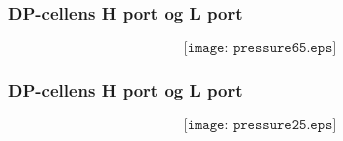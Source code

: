 \documentclass[aspectratio=169,xcolor=dvipsnames]{beamer}
\begin{document}
%
%
%
\begin{frame}
	\frametitle{DP-cellens H port og L port}

	$$\texttt{[image: pressure65.eps]}$$
\end{frame}
%
%
%
%
%
%
%
\begin{frame}
	\frametitle{DP-cellens H port og L port}

	$$\texttt{[image: pressure25.eps]}$$
\end{frame}
\end{document}
